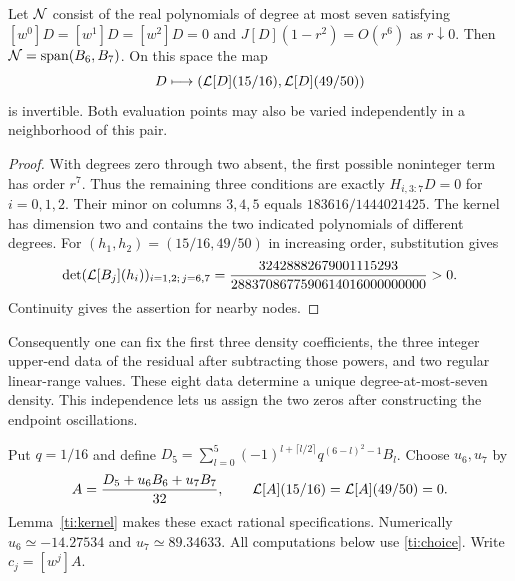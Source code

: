 \begin{lemma}\label{ti:kernel}
Let $\mathcal N$ consist of the real polynomials of degree at most seven satisfying
$[w^0]D=[w^1]D=[w^2]D=0$ and $J[D](1-r^2)=O(r^6)$ as $r\downarrow0$.
Then $\mathcal N=\operatorname{span}(B_6,B_7)$. On this space the map
\[
 D\longmapsto (\mathcal L[D](15/16),\mathcal L[D](49/50))
\]
is invertible. Both evaluation points may also be varied independently in
a neighborhood of this pair.
\end{lemma}
\begin{proof}
With degrees zero through two absent, the first possible noninteger term
has order $r^7$. Thus the remaining three conditions are exactly
$H_{i,3:7}D=0$ for $i=0,1,2$. Their minor on columns $3,4,5$ equals
$183616/1444021425$. The kernel has dimension two and contains the
two indicated polynomials of different degrees.
For $(h_1,h_2)=(15/16,49/50)$ in increasing order, substitution gives
\[
 \det (\mathcal L[B_{j}](h_i))_{i=1,2;\,j=6,7}
 =\frac{32428882679001115293}{2883708677590614016000000000}>0 .
\]
Continuity gives the assertion for nearby nodes.
\end{proof}

Consequently one can fix the first three density coefficients, the three
integer upper-end data of the residual after subtracting those powers,
and two regular linear-range values. These eight data determine a
unique degree-at-most-seven density. This independence lets us assign
the two zeros after constructing the endpoint oscillations.

Put $q=1/16$ and define $D_5=\sum_{l=0}^5
(-1)^{l+\lceil l/2\rceil}q^{(6-l)^2-1}B_l$. Choose $u_6,u_7$ by
\begin{equation}
 A=\frac{D_5+u_6B_6+u_7B_7}{32},\qquad
 \mathcal L[A](15/16)=\mathcal L[A](49/50)=0.                                 \label{ti:choice}
\end{equation}
Lemma~\ref{ti:kernel} makes these exact rational specifications. Numerically
$u_6\simeq-14.27534$ and $u_7\simeq89.34633$. All computations below
use \eqref{ti:choice}. Write $c_j=[w^j]A$.

